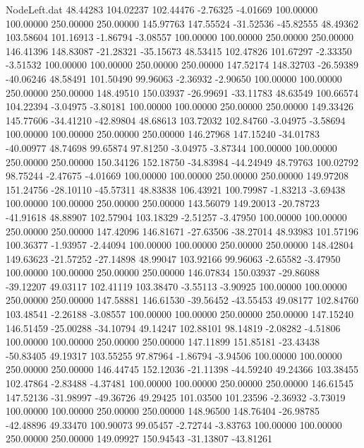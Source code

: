 \begin{filecontents}{NodeLeft.dat}
  48.44283  104.02237  102.44476    -2.76325   -4.01669  100.00000  100.00000  250.00000  250.00000  145.97763  147.55524  -31.52536  -45.82555
  48.49362  103.58604  101.16913    -1.86794   -3.08557  100.00000  100.00000  250.00000  250.00000  146.41396  148.83087  -21.28321  -35.15673
  48.53415  102.47826  101.67297    -2.33350   -3.51532  100.00000  100.00000  250.00000  250.00000  147.52174  148.32703  -26.59389  -40.06246
  48.58491  101.50490   99.96063    -2.36932   -2.90650  100.00000  100.00000  250.00000  250.00000  148.49510  150.03937  -26.99691  -33.11783
  48.63549  100.66574  104.22394    -3.04975   -3.80181  100.00000  100.00000  250.00000  250.00000  149.33426  145.77606  -34.41210  -42.89804
  48.68613  103.72032  102.84760    -3.04975   -3.58694  100.00000  100.00000  250.00000  250.00000  146.27968  147.15240  -34.01783  -40.00977
  48.74698   99.65874   97.81250    -3.04975   -3.87344  100.00000  100.00000  250.00000  250.00000  150.34126  152.18750  -34.83984  -44.24949
  48.79763  100.02792   98.75244    -2.47675   -4.01669  100.00000  100.00000  250.00000  250.00000  149.97208  151.24756  -28.10110  -45.57311
  48.83838  106.43921  100.79987    -1.83213   -3.69438  100.00000  100.00000  250.00000  250.00000  143.56079  149.20013  -20.78723  -41.91618
  48.88907  102.57904  103.18329    -2.51257   -3.47950  100.00000  100.00000  250.00000  250.00000  147.42096  146.81671  -27.63506  -38.27014
  48.93983  101.57196  100.36377    -1.93957   -2.44094  100.00000  100.00000  250.00000  250.00000  148.42804  149.63623  -21.57252  -27.14898
  48.99047  103.92166   99.96063    -2.65582   -3.47950  100.00000  100.00000  250.00000  250.00000  146.07834  150.03937  -29.86088  -39.12207
  49.03117  102.41119  103.38470    -3.55113   -3.90925  100.00000  100.00000  250.00000  250.00000  147.58881  146.61530  -39.56452  -43.55453
  49.08177  102.84760  103.48541    -2.26188   -3.08557  100.00000  100.00000  250.00000  250.00000  147.15240  146.51459  -25.00288  -34.10794
  49.14247  102.88101   98.14819    -2.08282   -4.51806  100.00000  100.00000  250.00000  250.00000  147.11899  151.85181  -23.43438  -50.83405
  49.19317  103.55255   97.87964    -1.86794   -3.94506  100.00000  100.00000  250.00000  250.00000  146.44745  152.12036  -21.11398  -44.59240
  49.24366  103.38455  102.47864    -2.83488   -4.37481  100.00000  100.00000  250.00000  250.00000  146.61545  147.52136  -31.98997  -49.36726
  49.29425  101.03500  101.23596    -2.36932   -3.73019  100.00000  100.00000  250.00000  250.00000  148.96500  148.76404  -26.98785  -42.48896
  49.33470  100.90073   99.05457    -2.72744   -3.83763  100.00000  100.00000  250.00000  250.00000  149.09927  150.94543  -31.13807  -43.81261

\end{filecontents}
